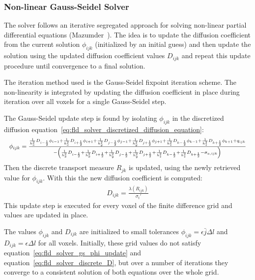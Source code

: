 \subsubsection*{Non-linear Gauss-Seidel Solver}

The solver follows an iterative segregated approach for solving non-linear partial differential equations (Mazumder~\cite{Mazumder2015}). The idea is to update the diffusion coefficient from the current solution $\phi_{ijk}$ (initialized by an initial guess) and then update the solution using the updated diffusion coefficient values $D_{ijk}$ and repeat this update procedure until convergence to a final solution.

The iteration method used is the Gauss-Seidel fixpoint iteration scheme. The non-linearity is integrated by updating the diffusion coefficient in place during iteration over all voxels for a single Gauss-Seidel step.

The Gauss-Seidel update step is found by isolating $\phi_{ijk}$ in the discretized diffusion equation~\ref{eq:fld_solver_discretized_diffusion_equation}:
\begin{equation}
\label{eq:fld_solver_gs_phi_update}
\resizebox{1.0\hsize}{!}{$
\phi_{ijk} =
\\
\frac
{
\frac{1}{h_x^2}D_{i-\frac{1}{2}}\phi_{i-1}
+\frac{1}{h_x^2}D_{i+\frac{1}{2}}\phi_{i+1}
+\frac{1}{h_y^2}D_{j-\frac{1}{2}}\phi_{j-1}
+\frac{1}{h_y^2}D_{j+\frac{1}{2}}\phi_{j+1}
+\frac{1}{h_z^2}D_{k-\frac{1}{2}}\phi_{k-1}
+\frac{1}{h_z^2}D_{k+\frac{1}{2}}\phi_{k+1}
+q_{ijk}
}
{
-\left(
\frac{1}{h_x^2}D_{i-\frac{1}{2}}+\frac{1}{h_x^2}D_{i+\frac{1}{2}}
+\frac{1}{h_y^2}D_{j-\frac{1}{2}}+\frac{1}{h_y^2}D_{j+\frac{1}{2}}
+\frac{1}{h_z^2}D_{k-\frac{1}{2}}+\frac{1}{h_z^2}D_{k+\frac{1}{2}}
-\sigma_{a, ijk}
\right)
}
$}
\end{equation}
Then the discrete transport measure $R_{jk}$ is updated, using the newly retrieved value for $\phi_{ijk}$. With this the new diffusion coefficient is computed:
\begin{align}
D_{ijk} = \frac{\lambda\left(R_{ijk}\right)}{\sigma_t'}
\label{eq:fld_solver_discrete_D}
\end{align}
This update step is executed for every voxel of the finite difference grid and values are updated in place.

The values $\phi_{ijk}$ and $D_{ijk}$ are initialized to small tolerances $\phi_{ijk} = \epsilon \bar{j}\Delta l$ and $D_{ijk} = \epsilon \Delta l$ for all voxels. Initially, these grid values do not satisfy equation~\ref{eq:fld_solver_gs_phi_update} and equation~\ref{eq:fld_solver_discrete_D}, but over a number of iterations they converge to a consistent solution of both equations over the whole grid. 

